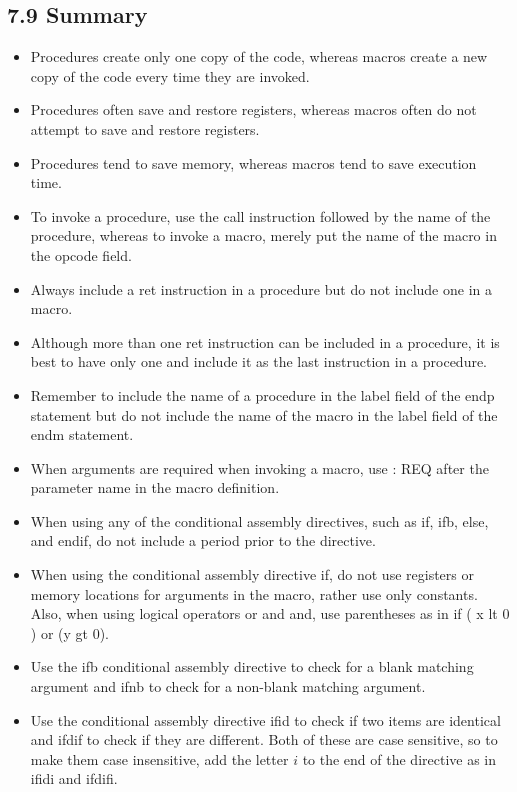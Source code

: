 \documentclass[10pt]{book}
\begin{document}
\begin{center}
\begin{center}
\subsection*{7.9 Summary}
\begin{itemize}
  \item Procedures create only one copy of the code, whereas macros create a new copy of the code every time they are invoked.
  \item Procedures often save and restore registers, whereas macros often do not attempt to save and restore registers.
  \item Procedures tend to save memory, whereas macros tend to save execution time.
  \item To invoke a procedure, use the call instruction followed by the name of the procedure, whereas to invoke a macro, merely put the name of the macro in the opcode field.
  \item Always include a ret instruction in a procedure but do not include one in a macro.
  \item Although more than one ret instruction can be included in a procedure, it is best to have only one and include it as the last instruction in a procedure.
  \item Remember to include the name of a procedure in the label field of the endp statement but do not include the name of the macro in the label field of the endm statement.
  \item When arguments are required when invoking a macro, use : REQ after the parameter name in the macro definition.
  \item When using any of the conditional assembly directives, such as if, ifb, else, and endif, do not include a period prior to the directive.
  \item When using the conditional assembly directive if, do not use registers or memory locations for arguments in the macro, rather use only constants. Also, when using logical operators or and and, use parentheses as in if ( x lt 0 ) or (y gt 0).
  \item Use the ifb conditional assembly directive to check for a blank matching argument and ifnb to check for a non-blank matching argument.
  \item Use the conditional assembly directive ifid to check if two items are identical and ifdif to check if they are different. Both of these are case sensitive, so to make them case insensitive, add the letter $i$ to the end of the directive as in ifidi and ifdifi.
\end{itemize}


\end{center}
\end{center}
\end{document}
